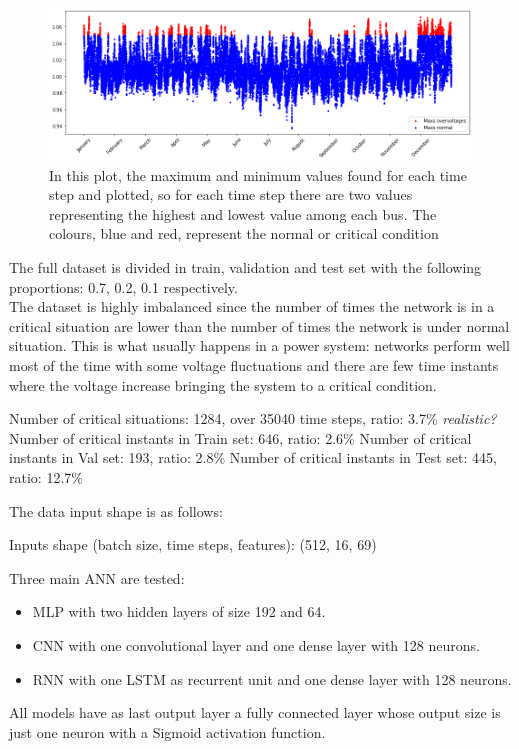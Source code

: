 \begin{figure}[H]
\centering
    \includegraphics[width=.8\linewidth]{images/MVOberr/CriticalSituation.png}
\caption{In this plot, the maximum and minimum values found for each time step and plotted, so for each time step there are two values representing the highest and lowest value among each bus. The colours, blue and red, represent the normal or critical condition}

 \end{figure}

The full dataset is divided in train, validation and test set with the following proportions: 0.7, 0.2, 0.1 respectively. \\

The dataset is highly imbalanced since the number of times the network is in a critical situation are lower than the number of times the network is under normal situation. This is what usually happens in a power system: networks perform well most of the time with some voltage fluctuations and there are few time instants where the voltage increase bringing the system to a critical condition.

\begin{algorithm}[H]
    \State Number of critical situations: 1284, over 35040 time steps, ratio: 3.7\% \emph{realistic?}
    \State Number of critical instants in Train set: 646, ratio: 2.6\%
    \State Number of critical instants in Val set: 193, ratio: 2.8\%
    \State Number of critical instants in Test set: 445, ratio: 12.7\%
\end{algorithm}

The data input shape is as follows:

\begin{algorithm}[H]
    \State Inputs shape (batch size, time steps, features): (512, 16, 69)
\end{algorithm}

Three main \gls{ANN} are tested:
\begin{itemize}
    \item \gls{MLP} with two hidden layers of size 192 and 64.
    \item \gls{CNN} with one convolutional layer and one dense layer with 128 neurons.
    \item \gls{RNN} with one \gls{LSTM} as recurrent unit and one dense layer with 128 neurons.
\end{itemize}
All models have as last output layer a fully connected layer whose output size is just one neuron with a Sigmoid activation function.\\

